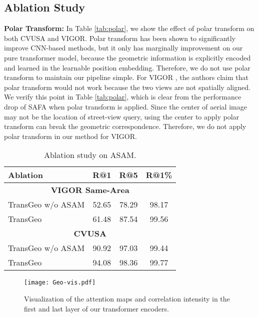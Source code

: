 \documentclass[10pt,twocolumn,letterpaper]{article}
\begin{document}
\subsection{Ablation Study}
\label{sec:ablation}
\noindent\textbf{Polar Transform:} In Table \ref{tab:polar}, we show the effect of polar transform on both CVUSA and VIGOR. Polar transform has been shown to significantly improve CNN-based methods, but it only has marginally improvement on our pure transformer model, because the geometric information is explicitly encoded and learned in the learnable position embedding. Therefore, we do not use polar transform to maintain our pipeline simple. For VIGOR \cite{zhu2021vigor}, the authors claim that polar transform would not work because the two views are not spatially aligned. We verify this point in Table \ref{tab:polar}, which is  clear from the performance drop of SAFA when polar transform is applied. Since the center of aerial image may not be the location of street-view query, using the center to apply polar transform can break the geometric correspondence. Therefore, we  do not apply polar transform in  our method for VIGOR. \\
\begin{table}[!htbp]
\small
\centering
\begin{tabular}{l c c c } \hline

\hline
Ablation & R@1 & R@5 & R@1\% \\\hline
\hline
 \multicolumn{4}{c}{\textbf{VIGOR Same-Area}}\\
\hline
TransGeo w/o ASAM &  52.65 & 78.29 & 98.17  \\
TransGeo & 61.48 & 87.54 & 99.56  \\
\hline
 \multicolumn{4}{c}{\textbf{CVUSA}}\\
\hline
TransGeo w/o ASAM &  90.92 & 97.03 & 99.44\\
TransGeo &  94.08 & 98.36  & 99.77 \\
\hline

\hline
\end{tabular}
\caption{Ablation study on ASAM.}
\label{tab:asam}
\vspace{-0.2cm}
\end{table}
\begin{figure*}[!htbp]
    \centering
    \vspace{-0.1cm}
    \texttt{[image: Geo-vis.pdf]}
    \vspace{-0.3cm}
    \caption{Visualization of the attention maps and correlation intensity in the first and last layer of our transformer encoders.}
    \vspace{-0.1cm}
    \label{fig:vis}
\end{figure*}
\end{document}
